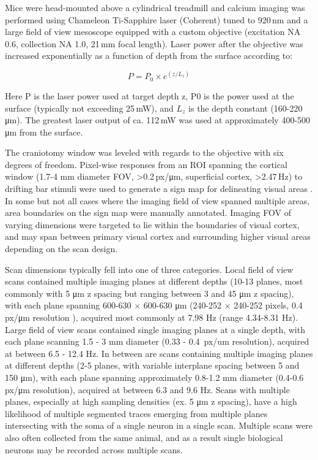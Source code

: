 \documentclass{article} %
\begin{document}
Mice were head-mounted above a cylindrical treadmill and calcium imaging was performed using Chameleon Ti-Sapphire laser (Coherent) tuned to 920\,nm and a large field of view mesoscope \citep{sofroniew2016large} equipped with a custom objective (excitation NA 0.6, collection NA 1.0,  21\,mm focal length). 
Laser power after the objective was increased exponentially as a function of depth from the surface according to:

\begin{equation}
    P = P_0 \times e^{(z/L_z)}
\end{equation}

Here P is the laser power used at target depth z, P0 is the power used at the surface (typically not exceeding 25\,mW), and $L_z$ is the depth constant (160-220\,μm).  
The greatest laser output of ca. 112\,mW was used at approximately 400-500\,μm from the surface.   

The craniotomy window was leveled with regards to the objective with six degrees of freedom.  
Pixel-wise responses from an ROI spanning the cortical window (1.7-4 mm diameter FOV, >0.2\,px/μm, superficial cortex, >2.47\,Hz) to drifting bar stimuli were used to generate a sign map for delineating visual areas \citep{Garrett2014-yn}.  
In some but not all cases where the imaging field of view spanned multiple areas, area boundaries on the sign map were manually annotated.  
Imaging FOV of varying dimensions were targeted to lie within the boundaries of visual cortex, and may span between primary visual cortex and surrounding higher visual areas depending on the scan design.  

Scan dimensions typically fell into one of three categories. 
Local field of view scans contained multiple imaging planes at different depths (10-13 planes, most commonly with 5 μm z spacing but ranging between 3 and 45 μm z spacing), with each plane spanning 600-630 $\times$ 600-630 μm (240-252 $\times$ 240-252 pixels, 0.4\,px/μm resolution ), acquired most commonly at 7.98 Hz (range 4.34-8.31 Hz). 
Large field of view scans contained single imaging planes at a single depth, with each plane scanning 1.5 - 3 mm diameter (0.33 - 0.4 \,px/um resolution), acquired at between 6.5 - 12.4 Hz. 
In between are scans containing multiple imaging planes at different depths (2-5 planes, with variable interplane spacing between 5 and 150 μm), with each plane spanning approximately 0.8-1.2 mm diameter (0.4-0.6 \,px/μm resolution), acquired at between 6.3 and 9.6 Hz.
Scans with multiple planes, especially at high sampling densities (ex. 5 μm z spacing), have a high likelihood of multiple segmented traces emerging from multiple planes intersecting with the soma of a single neuron in a single scan. 
Multiple scans were also often collected from the same animal, and as a result single biological neurons may be recorded across multiple scans. 
\end{document}
